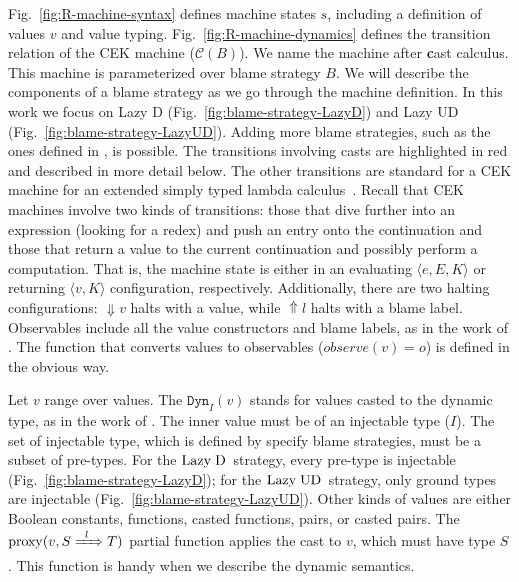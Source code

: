 \documentclass[runningheads]{llncs}
\newcommand{\LUD}{\ensuremath{\text{Lazy\;UD}}}
\newcommand{\LD}{\ensuremath{\text{Lazy\;D}}}
\newcommand{\CMachine}[1]{\ensuremath{\mathcal{C}(#1)}}
\newcommand{\error}[1]{\ensuremath{\mathop{\Uparrow}#1}}
\newcommand{\Pbool}[0]{\ensuremath{\mathtt{Bool}}}
\newcommand{\etrue}[0]{\mathtt{true}}
\newcommand{\ecast}[2]{\ensuremath{#1 : #2}}
\newcommand{\ccast}[3]{#1 \xRightarrow[]{\enskip #2 \enskip} #3}
\newcommand{\vdyn}[2]{\mathtt{Dyn}_{#1}(#2)}
\newcommand{\sexpr}[3]{\ensuremath{\langle#1,#2,#3\rangle}}
\newcommand{\scont}[2]{\ensuremath{\langle#1,#2\rangle}}
\newcommand{\shalt}[1]{\ensuremath{\mathop{\Downarrow} #1}}
\newcommand{\proxy}[2]{\ensuremath{\mathrm{proxy}(#1,#2)}}
\begin{document}
Fig.~\ref{fig:R-machine-syntax} defines machine 
states $s$, including a definition of values $v$ and value typing.
Fig.~\ref{fig:R-machine-dynamics} defines the transition relation of the CEK
machine (\CMachine{B}).
We name the machine after \textbf{c}ast calculus.
%
This machine is parameterized over blame strategy $B$. We will describe
the components of a blame strategy as we go through the machine definition.
In this work we focus on Lazy D (Fig.~\ref{fig:blame-strategy-LazyD}) and Lazy UD 
(Fig.~\ref{fig:blame-strategy-LazyUD}). Adding more blame strategies, 
such as the ones defined in \cite{siek2009exploring}, is possible.
%
The transitions involving casts are highlighted in red and described in
more detail below. The other transitions are standard for a CEK
machine for an extended simply typed lambda calculus~\citep{Felleisen:2009aa}.
%
Recall that CEK machines involve two kinds of transitions: those that
dive further into an expression (looking for a redex) and push an
entry onto the continuation and those that return a value to the
current continuation and possibly perform a computation.  That is, the
machine state is either in an evaluating $\sexpr{e}{E}{K}$ or
returning $\scont{v}{K}$ configuration, respectively. Additionally,
there are two halting configurations: \shalt{v} halts with a value,
while \error{l} halts with a blame label.  Observables include all the
value constructors and blame labels, as in the work of
\citet{siek2012interpretations}.  The function that converts values to
observables ($observe(v) = o$) is defined in the obvious way.

Let $v$ range over values. The $\vdyn{I}{v}$ stands for values casted
to the dynamic type, as in the work of \citet{wadler2009well}. The
inner value must be of an injectable type ($I$).
The set of injectable type, which is defined by specify blame strategies,
must be a subset of pre-types.
%
For the \LD\ strategy, every pre-type is injectable 
(Fig.~\ref{fig:blame-strategy-LazyD});
%
for the \LUD\ strategy, only ground types are injectable 
(Fig.~\ref{fig:blame-strategy-LazyUD}).
%
Other kinds of values are either Boolean constants, functions, casted 
functions, pairs, or casted pairs.
%
The \proxy{v}{\ccast{S}{l}{T}} partial function applies the cast to $v$, which must
have type $S$. This function is handy when we describe the dynamic semantics.
\end{document}
